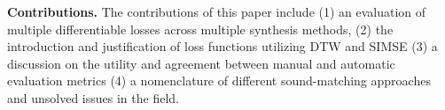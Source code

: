 \textbf{Contributions.} The contributions of this paper include (1) an evaluation of multiple differentiable losses across multiple synthesis methods, (2) the introduction and justification of loss functions utilizing DTW and SIMSE (3) a discussion on the utility and agreement between manual and automatic evaluation metrics (4) a nomenclature of different sound-matching approaches and unsolved issues in the field. 



